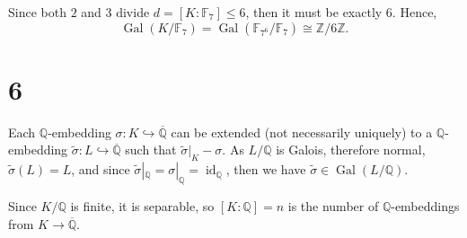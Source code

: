 \documentclass[12pt]{article}
\newcommand{\Z}{\mathbb{Z}}
\newcommand{\Q}{\mathbb{Q}}
\newcommand{\<}{\langle}
\renewcommand{\>}{\rangle}
\newcommand{\isom}{\cong}
\newcommand{\clo}{\overline}
\newcommand{\F}{\mathbb{F}}
\DeclareMathOperator{\id}{id}
\DeclareMathOperator{\Gal}{Gal}
\newcommand{\inc}{\hookrightarrow}
\begin{document}
Since both $2$ and $3$ divide $d = [K : \F_7] \leq 6$, then it must be exactly $6$. Hence,
\[
    \Gal(K / \F_7) = \Gal(\F_{7^6}/\F_7) \isom \Z/6\Z.
\]


\newpage
\section*{6}

Each $\Q$-embedding $\sigma : K \inc \clo{\Q}$ can be extended (not necessarily uniquely) to a $\Q$-embedding $\tilde{\sigma} : L \inc \clo{\Q}$ such that $\tilde{\sigma}|_K - \sigma$. As $L/\Q$ is Galois, therefore normal, $\tilde{\sigma}(L) = L$, and since $\tilde{\sigma}|_\Q = \sigma|_\Q = \id_{\Q}$, then we have $\tilde{\sigma} \in \Gal(L/\Q)$.

Since $K/\Q$ is finite, it is separable, so $[K : \Q] = n$ is the number of $\Q$-embeddings from $K \to \clo{\Q}$.
\end{document}
